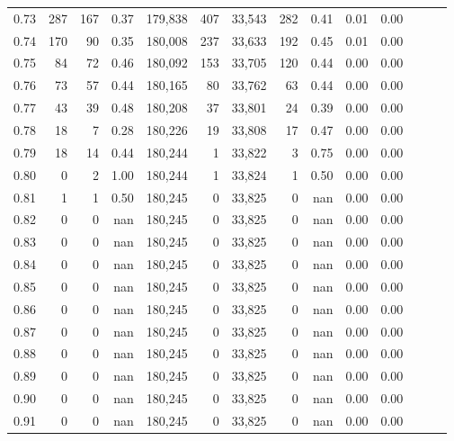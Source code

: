 \begin{tabular}{rrrrrrrrrrrrrr}
0.73 &    287 &    167 &  0.37 &  179,838 &      407 &  33,543 &     282 &  0.41 &  0.01 &      0.00 \\
0.74 &    170 &     90 &  0.35 &  180,008 &      237 &  33,633 &     192 &  0.45 &  0.01 &      0.00 \\
0.75 &     84 &     72 &  0.46 &  180,092 &      153 &  33,705 &     120 &  0.44 &  0.00 &      0.00 \\
0.76 &     73 &     57 &  0.44 &  180,165 &       80 &  33,762 &      63 &  0.44 &  0.00 &      0.00 \\
0.77 &     43 &     39 &  0.48 &  180,208 &       37 &  33,801 &      24 &  0.39 &  0.00 &      0.00 \\
0.78 &     18 &      7 &  0.28 &  180,226 &       19 &  33,808 &      17 &  0.47 &  0.00 &      0.00 \\
0.79 &     18 &     14 &  0.44 &  180,244 &        1 &  33,822 &       3 &  0.75 &  0.00 &      0.00 \\
0.80 &      0 &      2 &  1.00 &  180,244 &        1 &  33,824 &       1 &  0.50 &  0.00 &      0.00 \\
0.81 &      1 &      1 &  0.50 &  180,245 &        0 &  33,825 &       0 &   nan &  0.00 &      0.00 \\
0.82 &      0 &      0 &   nan &  180,245 &        0 &  33,825 &       0 &   nan &  0.00 &      0.00 \\
0.83 &      0 &      0 &   nan &  180,245 &        0 &  33,825 &       0 &   nan &  0.00 &      0.00 \\
0.84 &      0 &      0 &   nan &  180,245 &        0 &  33,825 &       0 &   nan &  0.00 &      0.00 \\
0.85 &      0 &      0 &   nan &  180,245 &        0 &  33,825 &       0 &   nan &  0.00 &      0.00 \\
0.86 &      0 &      0 &   nan &  180,245 &        0 &  33,825 &       0 &   nan &  0.00 &      0.00 \\
0.87 &      0 &      0 &   nan &  180,245 &        0 &  33,825 &       0 &   nan &  0.00 &      0.00 \\
0.88 &      0 &      0 &   nan &  180,245 &        0 &  33,825 &       0 &   nan &  0.00 &      0.00 \\
0.89 &      0 &      0 &   nan &  180,245 &        0 &  33,825 &       0 &   nan &  0.00 &      0.00 \\
0.90 &      0 &      0 &   nan &  180,245 &        0 &  33,825 &       0 &   nan &  0.00 &      0.00 \\
0.91 &      0 &      0 &   nan &  180,245 &        0 &  33,825 &       0 &   nan &  0.00 &      0.00 \\

\end{tabular}
